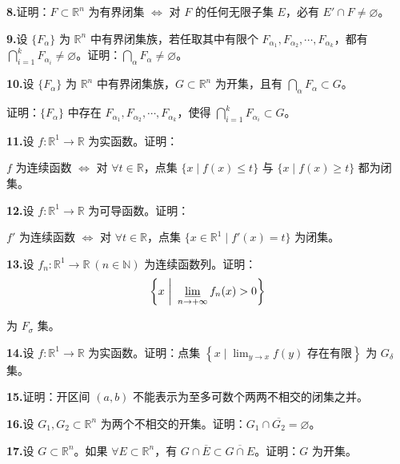 \documentclass[11pt,a4paper]{article}
\begin{document}
\par{}\noindent\textbf{8.}\quad 证明：$F\subset\mathbb R^n$ 为有界闭集 $\Leftrightarrow$ 对 $F$ 的任何无限子集 $E$，必有 $E'\cap F\ne\varnothing$。
\par{}\noindent\textbf{9.}\quad 设 $\{F_\alpha\}$ 为 $\mathbb R^n$ 中有界闭集族，若任取其中有限个 $F_{\alpha_1},F_{\alpha_2},\cdots,F_{\alpha_k}$，都有 $\bigcap_{i=1}^k F_{\alpha_i}\ne\varnothing$。证明：$\bigcap_\alpha F_\alpha\ne\varnothing$。
\par{}\noindent\textbf{10.}\quad 设 $\{F_\alpha\}$ 为 $\mathbb R^n$ 中有界闭集族，$G\subset\mathbb R^n$ 为开集，且有 $\bigcap_\alpha F_\alpha\subset G$。
\par\noindent 证明：$\{F_\alpha\}$ 中存在 $F_{\alpha_1},F_{\alpha_2},\cdots,F_{\alpha_k}$，使得 $\bigcap_{i=1}^k F_{\alpha_i}\subset G$。
\par{}\noindent\textbf{11.}\quad 设 $f:\mathbb R^1\to\mathbb R$ 为实函数。证明：
\par\noindent $f$ 为连续函数 $\Leftrightarrow$ 对 $\forall t\in\mathbb R$，点集 $\{x\mid f(x)\leq t\}$ 与 $\{x\mid f(x)\geq t\}$ 都为闭集。
\par{}\noindent\textbf{12.}\quad 设 $f:\mathbb R^1\to\mathbb R$ 为可导函数。证明：
\par\noindent $f'$ 为连续函数 $\Leftrightarrow$ 对 $\forall t\in\mathbb R$，点集 $\{x\in\mathbb R^1\mid f'(x)=t\}$ 为闭集。
\par{}\noindent\textbf{13.}\quad 设 $f_n:\mathbb R^1\to\mathbb R\ (n\in\mathbb N)$ 为连续函数列。证明：
\[\left\{x\ \bigg|\ \varliminf_{n\to+\infty} f_n(x)>0\right\}\]
\par\noindent 为 $F_\sigma$ 集。
\par{}\noindent\textbf{14.}\quad 设 $f:\mathbb R^1\to\mathbb R$ 为实函数。证明：点集 $\left\{x\mid \lim_{y\to x} f(y)\text{ 存在有限}\right\}$ 为 $G_\delta$ 集。
\par{}\noindent\textbf{15.}\quad 证明：开区间 $(a,b)$ 不能表示为至多可数个两两不相交的闭集之并。
\par{}\noindent\textbf{16.}\quad 设 $G_1,G_2\subset\mathbb R^n$ 为两个不相交的开集。证明：$G_1\cap\overline{G_2}=\varnothing$。
\par{}\noindent\textbf{17.}\quad 设 $G\subset\mathbb R^n$。如果 $\forall E\subset\mathbb R^n$，有 $G\cap\overline E\subset\overline{G\cap E}$。证明：$G$ 为开集。
\end{document}
